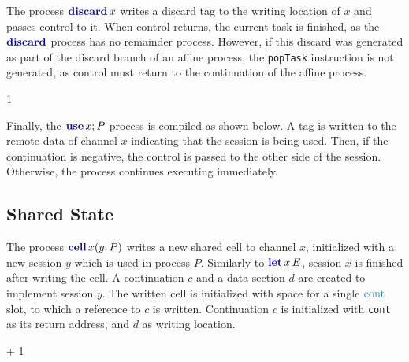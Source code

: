The process $\discardc{x}$ writes a discard tag to the writing location of $x$ and passes control to it. When control returns, the current task is finished, as the $\discardp$ process has no remainder process. However, if this discard was generated as part of the discard branch of an affine process, the \texttt{popTask} instruction is not generated, as control must return to the continuation of the affine process.

\begin{compilation}{\theta}{\Delta}{}
{1}
     
    \poptask{\hasexitpoint} 
\end{compilation}

Finally, the $\usec{x}{P}$ process is compiled as shown below. A tag is written to the remote data of channel $x$ indicating that the session is being used. Then, if the continuation is negative, the control is passed to the other side of the session. Otherwise, the process continues executing immediately.
\begin{compilation}{\theta}{\Delta}{}
{}
     
     
\end{compilation}

\subsection{Shared State}

The process $\cellc{x}{y}{P}$ writes a new shared cell to channel $x$, initialized with a new session $y$ which is used in process $P$. Similarly to $\letc{x}{E}$, session $x$ is finished after writing the cell. A continuation $c$ and a data section $d$ are created to implement session $y$. The written cell is initialized with space for a single $\conts$ slot, to which a reference to $c$ is written. Continuation $c$ is initialized with \texttt{cont} as its return address, and $d$ as writing location.
\begin{compilation}{\theta}{\Delta}{}
{ + 1}
\end{compilation}

